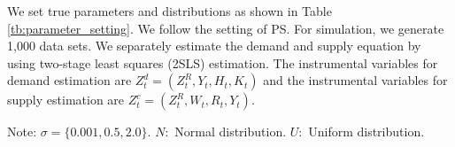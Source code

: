 \documentclass[11pt, a4paper]{article}
\begin{document}
We set true parameters and distributions as shown in Table \ref{tb:parameter_setting}. 
We follow the setting of PS. For simulation, we generate 1,000 data sets.
We separately estimate the demand and supply equation by using two-stage least squares (2SLS) estimation.
The instrumental variables for demand estimation are $Z^{d}_{t} = (Z^{R}_{t}, Y_t, H_{t}, K_{t})$ and the instrumental variables for supply estimation are $Z^{c}_{t} = (Z^{R}_{t}, W_{t}, R_{t}, Y_t)$. 

\begin{table}[!htbp]
    \caption{True parameters and distributions}
    \label{tb:parameter_setting}
    \begin{center}
    \end{center}
    \footnotesize
    Note: $\sigma=\{0.001, 0.5, 2.0\}$. $N:$ Normal distribution. $U:$ Uniform distribution.
\end{table}
\end{document}
